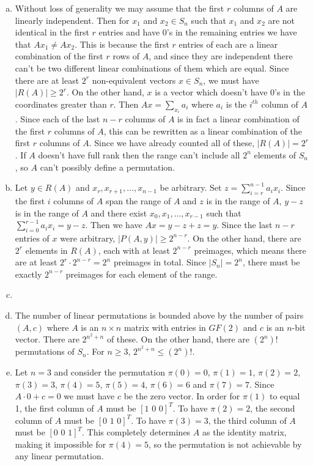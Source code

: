 \documentclass{article}
\begin{document}
\begin{enumerate}[a.]
\item Without loss of generality we may assume that the first $r$ columns of $A$ are linearly independent.  Then for $x_1$ and $x_2 \in S_n$ such that $x_1$ and $x_2$ are not identical in the first $r$ entries and have 0's in the remaining entries we have that $Ax_1 \neq Ax_2$.  This is because the first $r$ entries of each are a linear combination of the first $r$ rows of $A$, and since they are independent there can't be two different linear combinations of them which are equal.  Since there are at least $2^r$ non-equivalent vectors $x \in S_n$, we must have $|R(A)| \geq 2^r$.  On the other hand, $x$ is a vector which doesn't have 0's in the coordinates greater than $r$.  Then $Ax = \sum_{x_i}a_i$ where $a_i$ is the $i^{th}$ column of $A$.  Since each of the last $n - r$ columns of $A$ is in fact a linear combination of the first $r$ columns of $A$, this can be rewritten as a linear combination of the first $r$ columns of $A$.  Since we have already counted all of these, $|R(A)| = 2^r$.  If $A$ doesn't have full rank then the range can't include all $2^n$ elements of $S_n$, so $A$ can't possibly define a permutation.

\item Let $y \in R(A)$ and $x_r, x_{r+1}, \ldots, x_{n-1}$ be arbitrary.  Set $z = \sum_{i=r}^{n-1} a_ix_i$.  Since the first $i$ columns of $A$ span the range of $A$ and $z$ is in the range of $A$, $y-z$ is in the range of $A$ and there exist $x_0, x_1, \ldots, x_{r-1}$ such that $\sum_{i=0}^{r-1}a_ix_i = y-z$.  Then we have $Ax = y-z+z=y$.  Since the last $n-r$ entries of $x$ were arbitrary, $|P(A,y)| \geq 2^{n-r}$. On the other hand, there are $2^r$ elements in $R(A)$, each with at least $2^{n-r}$ preimages, which means there are at least $2^r \cdot 2^{n-r} = 2^n$ preimages in total.  Since $|S_n| = 2^n$, there must be exactly $2^{n-r}$ preimages for each element of the range. 

\item %

\item The number of linear permutations is bounded above by the number of pairs $(A,c)$ where $A$ is an $n \times n$ matrix with entries in $GF(2)$ and $c$ is an $n$-bit vector.  There are $2^{n^2+n}$ of these.  On the other hand, there are $(2^n)!$ permutations of $S_n$.  For $n \geq 3$, $2^{n^2+n} \leq (2^n)!$.  

\item Let $n=3$ and consider the permutation $\pi(0) = 0$, $\pi(1)=1$, $\pi(2)=2$, $\pi(3)=3$, $\pi(4) = 5$, $\pi(5)=4$, $\pi(6)=6$ and $\pi(7) = 7$.  Since $A\cdot0 + c=0$ we must have $c$ be the zero vector.  In order for $\pi(1)$ to equal 1, the first column of $A$ must be $[1\,\, 0\,\,0]^T$.  To have $\pi(2)=2$, the second column of $A$ must be $[0 \,\, 1\,\,0]^T$.  To have $\pi(3)=3$, the third column of $A$ must be $[0\,\, 0\,\, 1]^T$.  This completely determines $A$ as the identity matrix, making it impossible for $\pi(4)=5$, so the permutation is not achievable by any linear permutation. 

\end{enumerate}
\end{document}
